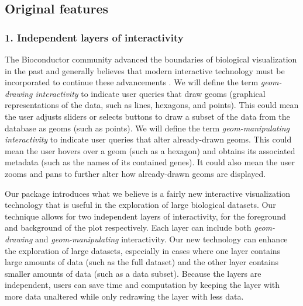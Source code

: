 \documentclass[parskip=full]{bmcart} %
\begin{document}
\subsection*{Original features}

\subsubsection*{1. Independent layers of interactivity}

The Bioconductor community advanced the boundaries of biological visualization in the past and generally believes that modern interactive technology must be incorporated to continue these advancements \cite{gentleman2004bioconductor}. We will define the term \textit{geom-drawing interactivity} to indicate user queries that draw geoms (graphical representations of the data, such as lines, hexagons, and points). This could mean the user adjusts sliders or selects buttons to draw a subset of the data from the database as geoms (such as points). We will define the term \textit{geom-manipulating interactivity} to indicate user queries that alter already-drawn geoms. This could mean the user hovers over a geom (such as a hexagon) and obtains its associated metadata (such as the names of its contained genes). It could also mean the user zooms and pans to further alter how already-drawn geoms are displayed.

Our package introduces what we believe is a fairly new interactive visualization technology that is useful in the exploration of large biological datasets. Our technique allows for two independent layers of interactivity, for the foreground and background of the plot respectively. Each layer can include both \textit{geom-drawing} and \textit{geom-manipulating} interactivity. Our new technology can enhance the exploration of large datasets, especially in cases where one layer contains large amounts of data (such as the full dataset) and the other layer contains smaller amounts of data (such as a data subset). Because the layers are independent, users can save time and computation by keeping the layer with more data unaltered while only redrawing the layer with less data.
\end{document}
